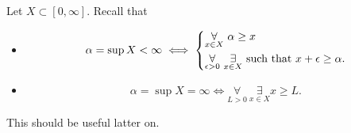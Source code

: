 \begin{prev}
	Let \(X\subset [0, \infty ]\). Recall that
	\begin{itemize}
		\item
		      \[
			      \alpha = \sup X < \infty \iff \begin{dcases}
				      \underset{x\in X}{\forall }\ \alpha \geq x \\
				      \underset{\epsilon >0}{\forall }\ \underset{x\in X}{\exists } \text{ such that } x+\epsilon \geq \alpha.
			      \end{dcases}
		      \]
		\item
		      \[
			      \alpha  = \sup X = \infty \iff \underset{L>0}{\forall }\ \underset{x\in X}{\exists } x\geq L.
		      \]
	\end{itemize}
	This should be useful latter on.
\end{prev}

